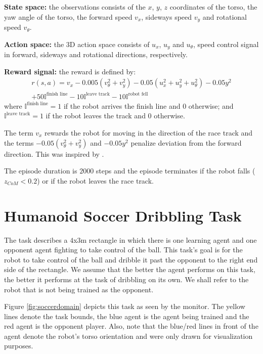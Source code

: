 \textbf{State space:} the observations consists of the $x$, $y$, $z$ coordinates of the torso, the yaw
angle of the torso, the forward speed $v_x$, sideways speed $v_y$ and rotational speed $v_{\theta}$.

\textbf{Action space:} the 3D action space consists of $u_x$, $u_y$ and $u_{\theta}$, speed control signal
in forward, sideways and rotational directions, respectively.

\textbf{Reward signal:} the reward is defined by:
\begin{equation*}
    \begin{aligned}
    r(s,a) = v_x - 0.005 (v_{\theta}^2 + v_y^2) - 0.05 (u_{x}^2 + u_{y}^2 + u_{\theta}^2) -  0.05 y^2 \\
        + 50 \mathbb{I}^{\text{finish line}} - 10\mathbb{I}^{\text{leave track}} - 10\mathbb{I}^{\text{robot fell}}
\end{aligned}
\end{equation*}
where $\mathbb{I}^{\text{finish line}} = 1$ if the robot arrives the finish line and $0$ otherwise; and 
$\mathbb{I}^{\text{leave track}} = 1$ if the robot leaves the track and $0$ otherwise.

The term $v_x$ rewards the robot for moving in the direction of the race track and the terms $-0.05 (v_{\theta}^2 + v_y^2)$ 
and $-0.05 y^2$  penalize deviation from the forward direction. This was inspired by \cite{BenchmarkingDRL}.

The episode duration is $2000$ steps and the episode terminates if the robot falls ($z_{CoM} < 0.2$)
or if the robot leaves the race track.

\section{Humanoid Soccer Dribbling Task}

The task describes a $4$x$3$m rectangle in which there is one learning agent and one opponent agent fighting to take control of the ball.
This task's goal is for the robot to take control of the ball and dribble it past the opponent to the right end side of the rectangle.
We assume that the better the agent performs on this task, the better it performs at the task of dribbling on its own.
We shall refer to the robot that is not being trained as the opponent.

Figure \ref{fig:soccerdomain} depicts this task as seen by the monitor. 
The yellow lines denote the task bounds, the blue agent is the agent being trained and the red agent is the
opponent player. Also, note that the blue/red lines in front of the agent denote the robot's torso orientation and
were only drawn for visualization purposes.

